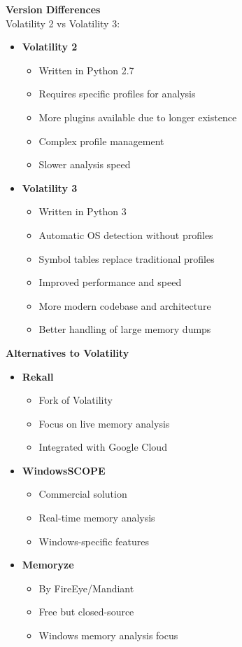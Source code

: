 \textbf{Version Differences}\\
Volatility 2 vs Volatility 3:
\begin{itemize}
   \item \textbf{Volatility 2}
       \begin{itemize}
           \item Written in Python 2.7
           \item Requires specific profiles for analysis
           \item More plugins available due to longer existence
           \item Complex profile management
           \item Slower analysis speed
       \end{itemize}
   \item \textbf{Volatility 3}
       \begin{itemize}
           \item Written in Python 3
           \item Automatic OS detection without profiles
           \item Symbol tables replace traditional profiles
           \item Improved performance and speed
           \item More modern codebase and architecture
           \item Better handling of large memory dumps
       \end{itemize}
\end{itemize}

\textbf{Alternatives to Volatility}
\begin{itemize}
   \item \textbf{Rekall}
       \begin{itemize}
           \item Fork of Volatility
           \item Focus on live memory analysis
           \item Integrated with Google Cloud
       \end{itemize}
   \item \textbf{WindowsSCOPE}
       \begin{itemize}
           \item Commercial solution
           \item Real-time memory analysis
           \item Windows-specific features
       \end{itemize}
   \item \textbf{Memoryze}
       \begin{itemize}
           \item By FireEye/Mandiant
           \item Free but closed-source
           \item Windows memory analysis focus
       \end{itemize}
\end{itemize}

